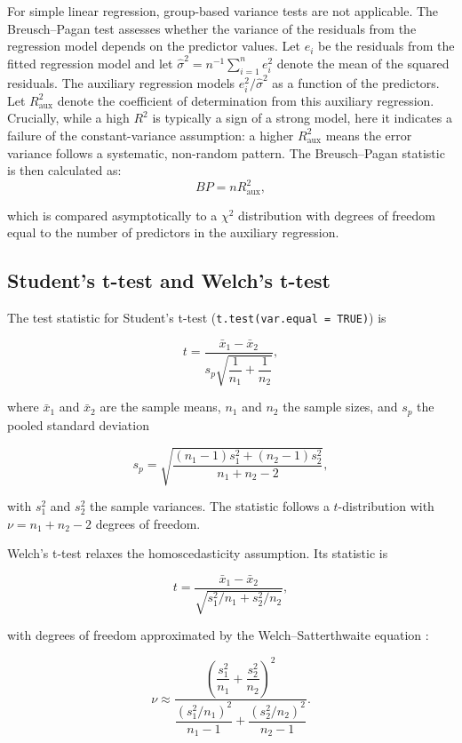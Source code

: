 For simple linear regression, group-based variance tests are not
applicable. The Breusch--Pagan test \citep{Breusch:1979} assesses whether the
variance of the residuals from the regression model depends on the
predictor values. Let \(e_i\) be the residuals from the fitted regression model and
let \(\hat{\sigma}^2 = n^{-1}\sum_{i=1}^n e_i^2\) denote the mean of the squared residuals. The auxiliary
regression models \(e_i^2 / \hat{\sigma}^2\) as a function of the
predictors. Let \(R^2_\text{aux}\) denote the coefficient of determination from this
auxiliary regression. Crucially, while a high \(R^2\) is typically a sign of
a strong model, here it indicates a failure of the constant-variance
assumption: a higher \(R^2_\text{aux}\) means the error variance follows
a systematic, non-random pattern. The Breusch--Pagan statistic is then
calculated as:
\[BP = n R^2_\text{aux},\]

which is compared asymptotically to a \(\chi^2\) distribution with degrees
of freedom equal to the number of predictors in the auxiliary regression.

\subsection{Student's t-test and Welch's t-test}\label{tt}

The test statistic for Student's t-test (\texttt{t.test(var.equal\ =\ TRUE)}) is

\[t = \frac{\bar{x}_1 - \bar{x}_2}{s_p \sqrt{\dfrac{1}{n_1} + \dfrac{1}{n_2}}},\]

where \(\bar{x}_1\) and \(\bar{x}_2\) are the sample means, \(n_1\) and \(n_2\)
the sample sizes, and \(s_p\) the pooled standard deviation

\[s_p = \sqrt{\frac{(n_1-1)s_1^2 + (n_2-1)s_2^2}{n_1+n_2-2}},\]

with \(s_1^2\) and \(s_2^2\) the sample variances. The statistic follows a
\(t\)-distribution with \(\nu = n_1 + n_2 - 2\) degrees of freedom.

Welch's t-test relaxes the homoscedasticity assumption. Its statistic is

\[t = \frac{\bar{x}_1 - \bar{x}_2}{\sqrt{s_1^2/n_1 + s_2^2/n_2}},\]

with degrees of freedom approximated by the Welch--Satterthwaite
equation \citep{Welch:1947, Satterthwaite:1946}:

\[\nu \approx \frac{\left(\dfrac{s_1^2}{n_1} + \dfrac{s_2^2}{n_2}\right)^2}
{\dfrac{(s_1^2/n_1)^2}{n_1-1} + \dfrac{(s_2^2/n_2)^2}{n_2-1}}.\]


